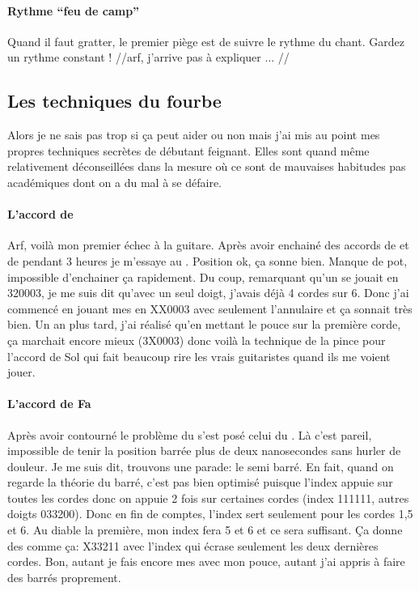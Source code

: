 \documentclass[versionenligne]{patacrep}
\begin{document}
\paragraph{Rythme ``feu de camp''} Quand il faut gratter, le premier
piège est de suivre le rythme du chant. Gardez un rythme constant !
//arf, j'arrive pas à expliquer ... //


\subsection{Les techniques du fourbe}

Alors je ne sais pas trop si ça peut aider ou non mais j'ai mis au
point mes propres techniques secrètes de débutant feignant. Elles sont
quand même relativement déconseillées dans la mesure où ce sont de
mauvaises habitudes pas académiques dont on a du mal à se défaire.

\paragraph{L'accord de }
Arf, voilà mon premier échec à la guitare. Après avoir enchainé des
accords de  et de  pendant 3 heures je
m'essaye au . Position ok, ça sonne bien. Manque de pot,
impossible d'enchainer ça rapidement.  Du coup, remarquant qu'un
 se jouait en 320003, je me suis dit qu'avec un seul
doigt, j'avais déjà 4 cordes sur 6. Donc j'ai commencé en jouant mes
 en XX0003 avec seulement l'annulaire et ça sonnait très
bien. Un an plus tard, j'ai réalisé qu'en mettant le pouce sur la
première corde, ça marchait encore mieux (3X0003) donc voilà la
technique de la pince pour l'accord de Sol qui fait beaucoup rire les
vrais guitaristes quand ils me voient jouer.

\paragraph{L'accord de Fa}
Après avoir contourné le problème du  s'est posé celui du
. Là c'est pareil, impossible de tenir la position barrée
plus de deux nanosecondes sans hurler de douleur.  Je me suis dit,
trouvons une parade: le semi barré.  En fait, quand on regarde la
théorie du barré, c'est pas bien optimisé puisque l'index appuie sur
toutes les cordes donc on appuie 2 fois sur certaines cordes (index
111111, autres doigts 033200). Donc en fin de comptes, l'index sert
seulement pour les cordes 1,5 et 6. Au diable la première, mon index
fera 5 et 6 et ce sera suffisant.  Ça donne des  comme ça: X33211
avec l'index qui écrase seulement les deux dernières cordes. Bon,
autant je fais encore mes  avec mon pouce, autant j'ai appris à
faire des barrés proprement.
\end{document}
